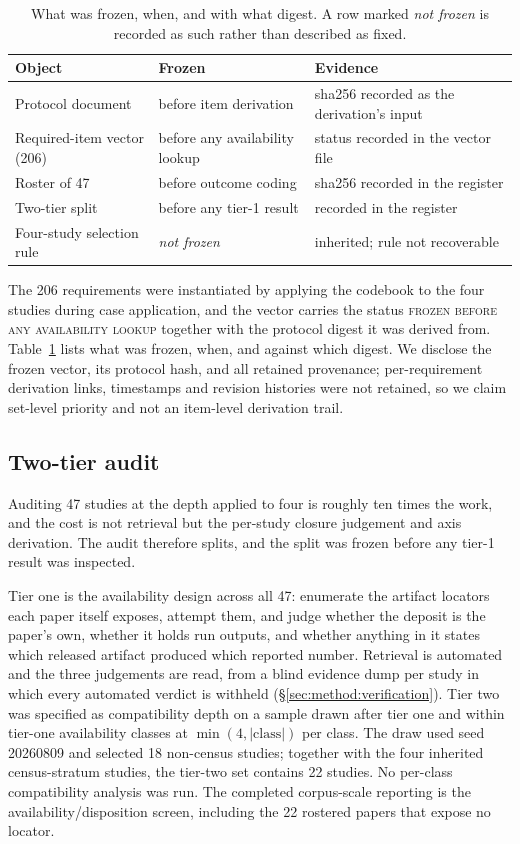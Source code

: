 \begin{table}[t]
\caption{What was frozen, when, and with what digest. A row marked \emph{not frozen} is
recorded as such rather than described as fixed.}
\label{tab:freeze}
\small
\begin{tabular}{p{}p{}p{}}
\toprule
Object & Frozen & Evidence \\
\midrule
Protocol document & before item derivation & sha256 recorded as the derivation's input \\
Required-item vector (206) & before any availability lookup & status recorded in the vector file \\
Roster of 47 & before outcome coding & sha256 recorded in the register \\
Two-tier split & before any tier-1 result & recorded in the register \\
Four-study selection rule & \emph{not frozen} & inherited; rule not recoverable \\
\bottomrule
\end{tabular}
\end{table}

The 206 requirements were instantiated by applying the codebook to the four studies during
case application, and the vector carries the status \textsc{frozen before any availability
lookup} together with the protocol digest it was derived from. Table~\ref{tab:freeze} lists what was frozen, when, and against which digest. We disclose the frozen vector,
its protocol hash, and all retained provenance; per-requirement derivation links, timestamps
and revision histories were not retained, so we claim set-level priority and not an
item-level derivation trail.

\subsection{Two-tier audit}
\label{sec:method:tiers}

Auditing 47 studies at the depth applied to four is roughly ten times the work, and the cost
is not retrieval but the per-study closure judgement and axis derivation. The audit
therefore splits, and the split was frozen before any tier-1 result was inspected.

Tier one is the availability design across all 47: enumerate the artifact locators each paper itself
exposes, attempt them, and judge whether the deposit is the paper's own, whether it holds
run outputs, and whether anything in it states which released artifact produced which
reported number. Retrieval is automated and the three judgements are read, from a blind
evidence dump per study in which every automated verdict is withheld
(\S\ref{sec:method:verification}). Tier two was specified as compatibility depth on a sample
drawn after tier one and within tier-one availability classes at
$\min(4, |\text{class}|)$ per class. The draw used seed 20260809 and selected 18 non-census
studies; together with the four inherited census-stratum studies, the tier-two set contains
22 studies. No per-class compatibility analysis was run. The completed
corpus-scale reporting is the availability/disposition screen, including the 22 rostered
papers that expose no locator.

